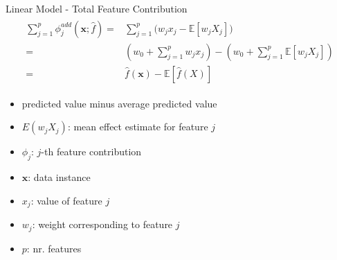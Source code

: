 \begin{frame}{Linear Model - Total Feature Contribution}
	\begin{align}
		\begin{split}
			\sum_{j=1}^{p}\phi^{add}_j\left(\bm{x};\hat{f}\right) =&\sum_{j=1}^p\bigl(w_{j}x_j-\mathbb{E}\left[w_{j}X_{j}\right]\bigr)\\
			=&\left(w_0+\sum_{j=1}^pw_{j}x_j\right)-\left(w_0+\sum_{j=1}^{p}\mathbb{E}\left[w_{j}X_{j}\right]\right)\\
			=&\hat{f}(\bm{x})-\mathbb{E}\left[\hat{f}(X)\right]
		\end{split}
	\end{align}
	\begin{itemize}
		\item predicted value minus average predicted value
		\item $E(w_{j}X_{j})$: mean effect estimate for feature $j$
		\item $\phi_j$: $j$-th feature contribution
		\item $\bm{x}$: data instance
		\item $x_j$: value of feature $j$
		\item $w_j$: weight corresponding to feature $j$
		\item $p$: nr. features
	\end{itemize}
\end{frame}